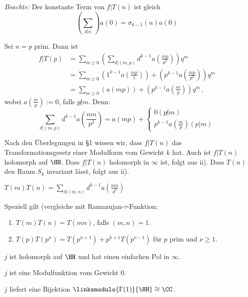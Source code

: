 \emph{Beachte:} Der konstante Term von $f | T(n)$ ist gleich
\[
\left( \sum_{d|n} \right) a(0) = \sigma_{k-1}(n) a(0)
\]

\begin{bsp}
Sei $n = p$ prim. Dann ist
\begin{align*}
f | T(p) &= \sum_{m \geq 0} \left( \sum_{d | (m,p)} d^{k-1} a\left(\frac{mp}{d^2}\right) \right) q^m\\
&= \sum_{m \geq 0} \left( 1^{k-1} a\left(\frac{mp}{1}\right) \right) + \left( p^{k-1} a\left(\frac{mp}{p^2}\right) \right) q^m \\
&= \sum_{m \geq 0} \left( a\left(mp\right) \right) + \left( p^{k-1} a\left(\frac{m}{p}\right) \right) q^m
\,,
\end{align*}
wobei $a\left(\frac mp\right) := 0$, falls $p \not | m$. Denn:
\[
\sum_{d | (m,p)} d^{k-1} a \left( \frac {mn}{p^2} \right) = a \left(mp\right) + \begin{cases} 0 (p \not | m) \\ p^{k-1} a \left(\frac mp \right) (p | m) \end{cases}
\]
\end{bsp}

\begin{bewe-list}
\item Nach den Überlegungen in §1 wissen wir, dass $f | T(n)$ das Transformationsgesetz einer Modulform vom Gewicht $k$ hat. Auch ist $f | T(n)$ holomorph auf $\HH$. Dass $f | T(n)$ holomorph in $\infty$ ist, folgt aus ii). Dass $T(n)$ den Raum $S_k$ invariant lässt, folgt aus ii).
\end{bewe-list}

\begin{satz-list}
\item $T(m) T(n) = \sum_{d | (m,n)} d^{k-1} a \left( \frac {mn}{d^2} \right)$
\end{satz-list}

Speziell gilt (vergleiche mit Ramanujan-$\tau$-Funktion: \begin{enumerate}
\item $T(m) T(n) = T(mn)$, falls $(m,n) = 1$.
\item $T(p) T(p^n) = T(p^{n+1}) + p^{k+1} T(p^{\nu-1})$ für $p$ prim und $\nu \geq 1$.
\end{enumerate}


\clearpage

\begin{satz-list}\label{satz:j_eigenschaften}
	\item $j$ ist holomorph auf $\HH$ und hat einen einfachen Pol in $\infty$.
	\item $j$ ist eine Modulfunktion vom Gewicht $0$.
	\item $j$ liefert eine Bijektion $\linksmodulo{\Gamma(1)}{\HH} \cong \CC$.
\end{satz-list}

